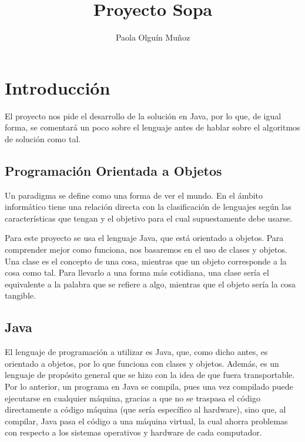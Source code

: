 \documentclass{article}
\title{Proyecto Sopa}
\author{Paola Olguín Muñoz}
\begin{document}
  \begin{titlepage}
    \maketitle
  \end{titlepage}
  \newpage
  \tableofcontents
  \listoffigures
  \newpage
  \section{Introducción}



    El proyecto nos pide el desarrollo de la  solución en Java, por lo que, de
    igual forma, se comentará un poco sobre el lenguaje antes de hablar sobre el
    algoritmos de solución como tal.

    \subsection{Programación Orientada a Objetos}
      Un paradigma se define como una forma de ver el mundo. En el ámbito
      informático tiene una relación directa con la clasificación de lenguajes según
      las características que tengan y el objetivo para el cual supuestamente debe
      usarse.

      Para este proyecto se usa el lenguaje Java, que está orientado a objetos.
      Para comprender mejor como funciona, nos basaremos en el uso de clases y objetos.
      Una clase es el concepto de una cosa, mientras que un objeto corresponde a la
      cosa como tal. Para llevarlo a una forma más cotidiana, una clase sería el
      equivalente a la palabra que se refiere a algo, mientras que el objeto sería
      la cosa tangible.

    \subsection{Java}
      El lenguaje de programación a utilizar es Java, que, como dicho antes, es
      orientado a objetos, por lo que funciona con clases y objetos. Además, es un
      lenguaje de propósito general que se hizo con la idea de que fuera transportable.
      Por lo anterior, un programa en Java se compila, pues una vez compilado puede
      ejecutarse en cualquier máquina, gracias a que no se traspasa el código
      directamente a código máquina (que sería específico al hardware), sino que,
      al compilar, Java pasa el código a una máquina virtual, la cual ahorra problemas
      con respecto a los sistemas operativos y hardware de cada computador.
\end{document}
